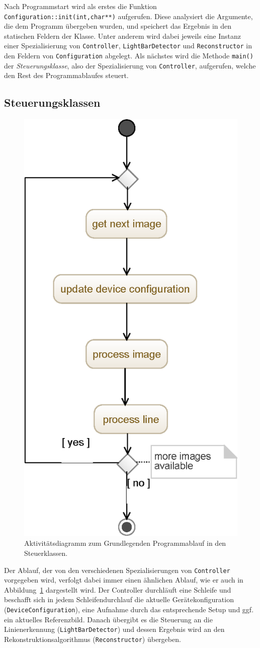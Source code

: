 \documentclass[ngerman,a4paper,parskip=half]{scrartcl}
\begin{document}
Nach Programmstart wird als erstes die Funktion \texttt{Configuration::init(int,char**)} aufgerufen. Diese analysiert die Argumente, die dem Programm übergeben wurden, und speichert das Ergebnis in den statischen Feldern der Klasse. Unter anderem wird dabei jeweils eine Instanz einer Spezialisierung von \texttt{Controller}, \texttt{LightBarDetector} und \texttt{Reconstructor} in den Feldern von \texttt{Configuration} abgelegt. Als nächstes wird die Methode \texttt{main()} der \emph{Steuerungsklasse}, also der Spezialisierung von \texttt{Controller}, aufgerufen, welche den Rest des Programmablaufes steuert.

\subsection{Steuerungsklassen}
\label{sec:controller}

\begin{figure}
	\centering
	\includegraphics[width=0.4\linewidth]{includes/software_controller}
	\caption{Aktivitätsdiagramm zum Grundlegenden Programmablauf in den Steuerklassen.}
	\label{fig:software_controller}
\end{figure}

Der Ablauf, der von den verschiedenen Spezialisierungen von \texttt{Controller} vorgegeben wird, verfolgt dabei immer einen ähnlichen Ablauf, wie er auch in Abbildung~\ref{fig:software_controller} dargestellt wird. Der Controller durchläuft eine Schleife und beschafft sich in jedem Schleifendurchlauf die aktuelle Gerätekonfiguration (\texttt{DeviceConfiguration}), eine Aufnahme durch das entsprechende Setup und ggf. ein aktuelles Referenzbild. Danach übergibt es die Steuerung an die Linienerkennung (\texttt{LightBarDetector}) und dessen Ergebnis wird an den Rekonstruktionsalgorithmus (\texttt{Reconstructor}) übergeben.
\end{document}
